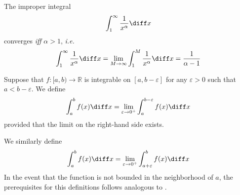 \begin{thm}\label{thm-geometric-improper-integral}
	The improper integral
	\begin{equation*}
		\int_1^\infty \frac{1}{x^\alpha} \diff x
	\end{equation*}
	converges \textit{iff} $\alpha>1$, \textit{i.e.}
	\begin{equation}\label{eq-geometric-improper-integral:1}
		\int_1^\infty \frac{1}{x^\alpha} \diff x = \lim_{M\to\infty} \int_1^M \frac{1}{x^\alpha} \diff x = \frac{1}{\alpha-1}
	\end{equation}
\end{thm}

\begin{definition}\label{def-integral-of-unbounded-functions}
	Suppose that $f:[a,b)\to\mathbb{R}$ is integrable on $[a,b-\varepsilon]$ for
	any $\varepsilon>0$ such that $a<b-\varepsilon$. We define
	\begin{equation}\label{eq-integral-of-unbounded-functions:1}
		\int_a^b f(x) \diff x = \lim_{\varepsilon\to0^+}\int_a^{b-\varepsilon} f(x) \diff x
	\end{equation}
	provided that the limit on the right-hand side exists.
\end{definition}

\begin{rem}\label{rem-integral-of-unbounded-functions}
	We similarly define
	\begin{equation}\label{eq-integral-of-unbounded-functions:2}
		\int_a^b f(x) \diff x = \lim_{\varepsilon\to0^+}\int_{a+\varepsilon}^b f(x) \diff x
	\end{equation}
	In the event that the function is not bounded in the neighborhood of $a$, the
	prerequisites for this definitions follows analogous to .
\end{rem}

